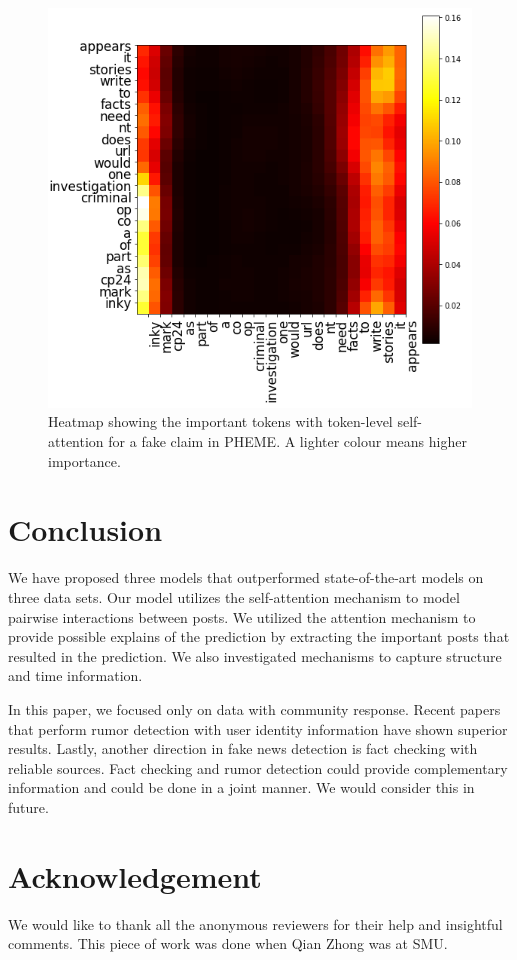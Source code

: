 \documentclass[letterpaper]{article} %
\begin{document}
\begin{figure}[t]
\centering
\includegraphics[width= 0.8 \columnwidth]{word_level_attention_cmyk.png}
\caption{Heatmap showing the important tokens with token-level self-attention for a fake claim in PHEME. A lighter colour means higher importance.}
\label{fig:heatmap}
\end{figure}

\section{Conclusion}

We have proposed three models that outperformed state-of-the-art models on three data sets. Our model utilizes the self-attention mechanism to model pairwise interactions between posts. We utilized the attention mechanism to provide possible explains of the prediction by extracting the important posts that resulted in the prediction. We also investigated mechanisms to capture structure and time information.

In this paper, we focused only on data with community response. Recent papers that perform rumor detection with user identity information have shown superior results.
Lastly, another direction in fake news detection is fact checking with reliable sources. Fact checking and rumor detection could provide complementary information and could be done in a joint manner. We would consider this in future.

\section*{Acknowledgement}
We would like to thank all the anonymous reviewers for their help and insightful comments. This piece of work was done when Qian Zhong was at SMU.

\fontsize{9.0pt}{10.0pt} \selectfont



\end{document}
